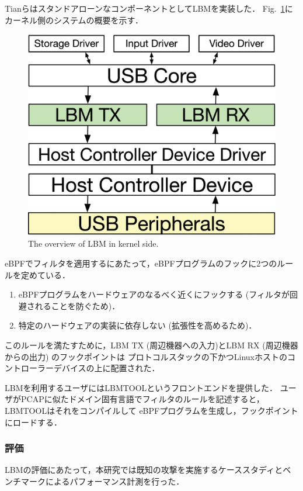 \documentclass[platex,a4j,10pt,twoside,twocolumn,dvipdfmx]{jsarticle}
\newcommand{\Fref}[1]{Fig.~\ref{#1}}
\begin{document}
TianらはスタンドアローンなコンポーネントとしてLBMを実装した．
\Fref{img:kernel-design}にカーネル側のシステムの概要を示す．
\begin{figure}[tp]
  \begin{center}
    \includegraphics[width=\columnwidth]{./img/sodapdf-converted.png}
  \end{center}
  \caption{The overview of LBM in kernel side. \cite{tian2019lbm}}
  \label{img:kernel-design}
\end{figure}
eBPFでフィルタを適用するにあたって，eBPFプログラムのフックに2つのルールを定めている．
\begin{enumerate}
  \item eBPFプログラムをハードウェアのなるべく近くにフックする (フィルタが回避されることを防ぐため)．
  \item 特定のハードウェアの実装に依存しない (拡張性を高めるため)．
\end{enumerate}
このルールを満たすために，LBM TX (周辺機器への入力)とLBM RX (周辺機器からの出力) のフックポイントは
プロトコルスタックの下かつLinuxホストのコントローラーデバイスの上に配置された．

LBMを利用するユーザにはLBMTOOLというフロントエンドを提供した．
ユーザがPCAPに似たドメイン固有言語でフィルタのルールを記述すると，LBMTOOLはそれをコンパイルして
eBPFプログラムを生成し，フックポイントにロードする．

\subsubsection{評価}
LBMの評価にあたって，本研究では既知の攻撃を実施するケーススタディとベンチマークによるパフォーマンス計測を行った．
\end{document}
